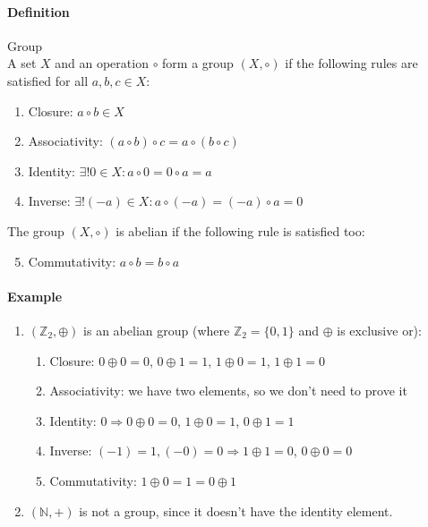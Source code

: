\documentclass{article}
\newcommand{\N}{\mathbb{N}}
\newcommand{\Z}{\mathbb{Z}}
\newcommand{\Def}{\paragraph{Definition}}
\newcommand{\Example}{\paragraph{Example}}
\begin{document}
	\Def Group
\\A set $X$ and an operation $\circ$ form a group $(X, \circ)$ if the following
	rules are satisfied for all $a, b, c \in X$:
	\begin{enumerate}[label=(\roman*)]
		\item Closure: $a \circ b \in X$

		\item Associativity: $(a \circ b) \circ c = a \circ (b \circ c)$

		\item Identity: $\exists! 0 \in X : a \circ 0 = 0 \circ a = a$

		\item Inverse: $\exists! (-a) \in X : a \circ (-a) = (-a) \circ a = 0$
		\end{enumerate}
		The group $(X, \circ)$ is abelian if the following rule is satisfied too:
		\begin{enumerate}[label=(\roman*)]
		\setcounter{enumi}{4}
		\item Commutativity: $a \circ b = b \circ a$
	\end{enumerate}

	\Example
	\begin{enumerate}[label=(\arabic*)]
		\item $(\Z_2, \oplus)$ is an abelian group (where $\Z_2 = \{ 0, 1 \}$ and
		$\oplus$ is exclusive or):
		\begin{enumerate}[label=(\roman*)]
			\item Closure: $0 \oplus 0 = 0$, $0 \oplus 1 = 1$, $1 \oplus 0 = 1$,
			$1 \oplus 1 = 0$
			\item Associativity: we have two elements, so we don't need to prove it
			\item Identity: $0 \Rightarrow 0 \oplus 0 = 0$, $1 \oplus 0 = 1$,
			$0 \oplus 1 = 1$
			\item Inverse: $(-1) = 1, (-0) = 0 \Rightarrow 1 \oplus 1 = 0$,
			$0 \oplus 0 = 0$
			\item Commutativity: $1 \oplus 0 = 1 = 0 \oplus 1$
		\end{enumerate}

		\item $(\N, +)$ is not a group, since it doesn't have the identity element.
	\end{enumerate}
\end{document}
